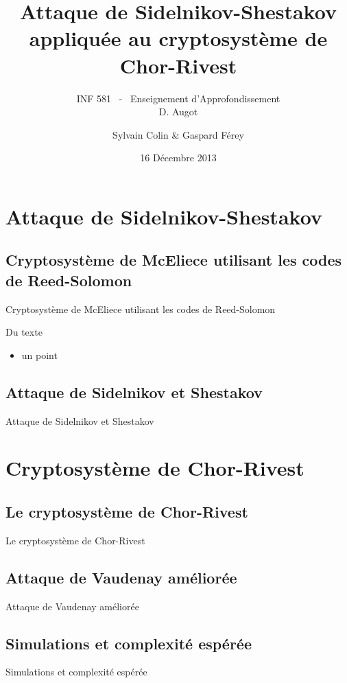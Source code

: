 \documentclass[]{beamer}
\title[Attaque de Chor-Rivest]{Attaque de Sidelnikov-Shestakov appliquée au cryptosystème de Chor-Rivest }
\subtitle{INF 581 \ - \ Enseignement d'Approfondissement \\ D. Augot}
\author[S. Colin \& G. Férey]{Sylvain Colin \& Gaspard Férey}
\institute[X 2011]{Département d'Informatique\\ Ecole Polytechnique, France }
\date{16 Décembre 2013}
\begin{document}
\begin{frame}[plain]
  \titlepage
\end{frame}


\section{Attaque de Sidelnikov-Shestakov}

\subsection{Cryptosystème de McEliece utilisant les codes de Reed-Solomon}

\begin{frame}{Cryptosystème de McEliece utilisant les codes de Reed-Solomon}

Du texte
\begin{itemize}
\item un point
\end{itemize}

\end{frame}


\subsection{Attaque de Sidelnikov et Shestakov}

\begin{frame}{Attaque de Sidelnikov et Shestakov}

\end{frame}



\section{Cryptosystème de Chor-Rivest}


\subsection{Le cryptosystème de Chor-Rivest}
\begin{frame}{Le cryptosystème de Chor-Rivest}

\end{frame}


\subsection{Attaque de Vaudenay améliorée}
\begin{frame}{Attaque de Vaudenay améliorée}

\end{frame}



\subsection{Simulations et complexité espérée}
\begin{frame}{Simulations et complexité espérée}

\end{frame}
\end{document}
